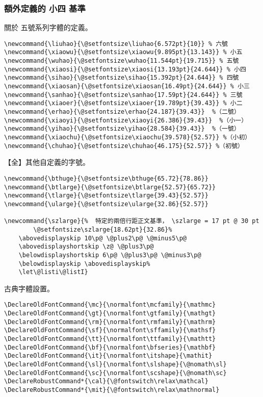 \subsubsection{額外定義的 小四 基準}

\par 關於 五號系列字體的定義。
\begin{lstlisting}[firstnumber=473]
\newcommand{\liuhao}{\@setfontsize\liuhao{6.572pt}{10}} % 六號
\newcommand{\xiaowu}{\@setfontsize\xiaowu{9.895pt}{13.143}} % 小五
\newcommand{\wuhao}{\@setfontsize\wuhao{11.544pt}{19.715}} % 五號
\newcommand{\xiaosi}{\@setfontsize\xiaosi{13.193pt}{24.644}} % 小四
\newcommand{\sihao}{\@setfontsize\sihao{15.392pt}{24.644}} % 四號
\newcommand{\xiaosan}{\@setfontsize\xiaosan{16.49pt}{24.644}} % 小三
\newcommand{\sanhao}{\@setfontsize\sanhao{17.59pt}{24.644}} % 三號
\newcommand{\xiaoer}{\@setfontsize\xiaoer{19.789pt}{39.43}} % 小二
\newcommand{\erhao}{\@setfontsize\erhao{24.187}{39.43}}  %（二號）
\newcommand{\xiaoyi}{\@setfontsize\xiaoyi{26.386}{39.43}}  %（小一）
\newcommand{\yihao}{\@setfontsize\yihao{28.584}{39.43}}  %（一號）
\newcommand{\xiaochu}{\@setfontsize\xiaochu{39.578}{52.57}} %（小初）
\newcommand{\chuhao}{\@setfontsize\chuhao{46.175}{52.57}} %（初號）
\end{lstlisting}


\par 【全】其他自定義的字號。
\begin{lstlisting}[firstnumber=488]
\newcommand{\bthuge}{\@setfontsize\bthuge{65.72}{78.86}}
\newcommand{\btlarge}{\@setfontsize\btlarge{52.57}{65.72}}
\newcommand{\tlarge}{\@setfontsize\tlarge{39.43}{52.57}}
\newcommand{\ularge}{\@setfontsize\ularge{32.86}{52.57}}

\newcommand{\szlarge}{%  特定的兩倍行距正文基準， \szlarge = 17 pt @ 30 pt
		\@setfontsize\szlarge{18.62pt}{32.86}%
  	\abovedisplayskip 10\p@ \@plus2\p@ \@minus5\p@
  	\abovedisplayshortskip \z@ \@plus3\p@
  	\belowdisplayshortskip 6\p@ \@plus3\p@ \@minus3\p@
   	\belowdisplayskip \abovedisplayskip%
   	\let\@listi\@listI}
\end{lstlisting}


\par 古典字體設置。
\begin{lstlisting}[firstnumber=502]
\DeclareOldFontCommand{\mc}{\normalfont\mcfamily}{\mathmc}
\DeclareOldFontCommand{\gt}{\normalfont\gtfamily}{\mathgt}
\DeclareOldFontCommand{\rm}{\normalfont\rmfamily}{\mathrm}
\DeclareOldFontCommand{\sf}{\normalfont\sffamily}{\mathsf}
\DeclareOldFontCommand{\tt}{\normalfont\ttfamily}{\mathtt}
\DeclareOldFontCommand{\bf}{\normalfont\bfseries}{\mathbf}
\DeclareOldFontCommand{\it}{\normalfont\itshape}{\mathit}
\DeclareOldFontCommand{\sl}{\normalfont\slshape}{\@nomath\sl}
\DeclareOldFontCommand{\sc}{\normalfont\scshape}{\@nomath\sc}
\DeclareRobustCommand*{\cal}{\@fontswitch\relax\mathcal}
\DeclareRobustCommand*{\mit}{\@fontswitch\relax\mathnormal}
\end{lstlisting}

